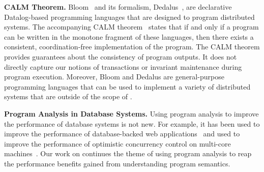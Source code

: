 \textbf{CALM Theorem.}
Bloom~\cite{alvaro2010boom, alvaro2011consistency, conway2012logic} and its
formalism, Dedalus~\cite{alvaro2011dedalus, alvaro2013declarative}, are
declarative Datalog-based programming languages that are designed to program
distributed systems. The accompanying CALM
theorem~\cite{hellerstein2010declarative, ameloot2013relational} states that if
and only if a program can be written in the monotone fragment of these
languages, then there exists a consistent, coordination-free implementation of
the program.  The CALM theorem provides guarantees about the consistency of
program outputs. It does not directly capture our notions of transactions or
invariant maintenance during program execution.  Moreover, Bloom and Dedalus
are general-purpose programming languages that can be used to implement a
variety of distributed systems that are outside of the scope of
\invariantconfluence{}.

\textbf{Program Analysis in Database Systems.} Using program analysis to
improve the performance of database systems is not new. For example, it has
been used to improve the performance of database-backed web
applications~\cite{cheung2014using, wu2016transaction,
ramachandra2012program} and used to improve the performance of optimistic
concurrency control on multi-core machines~\cite{wu2016transaction}. Our work
on \invariantconfluence{} continues the theme of using program analysis to
reap the performance benefits gained from understanding program semantics.
